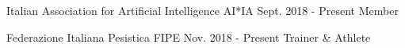 

\begin{cventries}

  \cventry
    {Italian Association for Artificial Intelligence}
    {AI*IA}
    {}
    {Sept. 2018 - Present}
    {Member}

  \cventry
    {Federazione Italiana Pesistica}
    {FIPE}
    {}
    {Nov. 2018 - Present}
    {Trainer \& Athlete}

\end{cventries}
